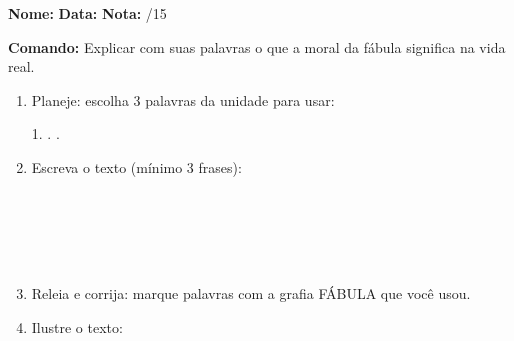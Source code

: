 

\begin{exercicio}

\noindent\textbf{Nome:} \underline{\hspace{3.2cm}} \quad \textbf{Data:} \underline{\hspace{1.6cm}} \quad \textbf{Nota:} \underline{\hspace{0.9cm}}/15


\noindent\textbf{Comando:} Explicar com suas palavras o que a moral da fábula significa na vida real.


\begin{enumerate}

  \item Planeje: escolha 3 palavras da unidade para usar:
  \begin{center}
  1. \underline{\hspace{3cm}} . \underline{\hspace{3cm}} . \underline{\hspace{3cm}}
  \end{center}

  \item Escreva o texto (mínimo 3 frases):
  \begin{center}
  \underline{\hspace{12cm}}\\\underline{\hspace{12cm}}\\\underline{\hspace{12cm}}\\\underline{\hspace{12cm}}\\\underline{\hspace{12cm}}
  \end{center}

  \item Releia e corrija: marque palavras com a grafia FÁBULA que você usou.

  \item Ilustre o texto:
  \begin{center}
  \end{center}

\end{enumerate}

\end{exercicio}

